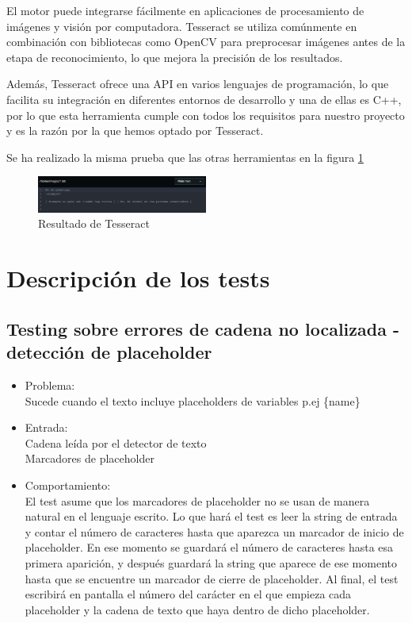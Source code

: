 \begin{enumerate}
	El motor puede integrarse fácilmente en aplicaciones de procesamiento de imágenes y visión por computadora. Tesseract se utiliza comúnmente en combinación con bibliotecas como OpenCV para preprocesar imágenes antes de la etapa de reconocimiento, lo que mejora la precisión de los resultados.
	
	Además, Tesseract ofrece una API en varios lenguajes de programación, lo que facilita su integración en diferentes entornos de desarrollo y una de ellas es C++, por lo que esta herramienta cumple con todos los requisitos para nuestro proyecto y es la razón por la que hemos optado por Tesseract.
	
	Se ha realizado la misma prueba que las otras herramientas en la figura \ref{fig:Tesseract_Test}
	\begin{figure}[h]
		\centering
		\includegraphics[width = 0.5\textwidth]{Imagenes/OCR/Tesseract_Test.png}
		\caption{Resultado de Tesseract}
		\label{fig:Tesseract_Test}
	\end{figure}
\end{enumerate}
\section{Descripción de los tests}
\subsection{Testing sobre errores de cadena no localizada - detección de placeholder}
\begin{itemize}
	\item Problema: \\
	Sucede cuando el texto incluye placeholders de variables p.ej \{name\}  \\
	\item Entrada: \\
	Cadena leída por el detector de texto \\
	Marcadores de placeholder \\
	\item Comportamiento: \\
	El test asume que los marcadores de placeholder no se usan de manera natural en el lenguaje escrito.
	Lo que hará el test es leer la string de entrada y contar el número de caracteres hasta que aparezca un marcador de inicio de placeholder. En ese momento se guardará el número de caracteres hasta esa primera aparición, y después guardará la string que aparece de ese momento hasta que se encuentre un marcador de cierre de placeholder. 
	Al final, el test escribirá en pantalla el número del carácter en el que empieza cada placeholder y la cadena de texto que haya dentro de dicho placeholder.
\end{itemize}

